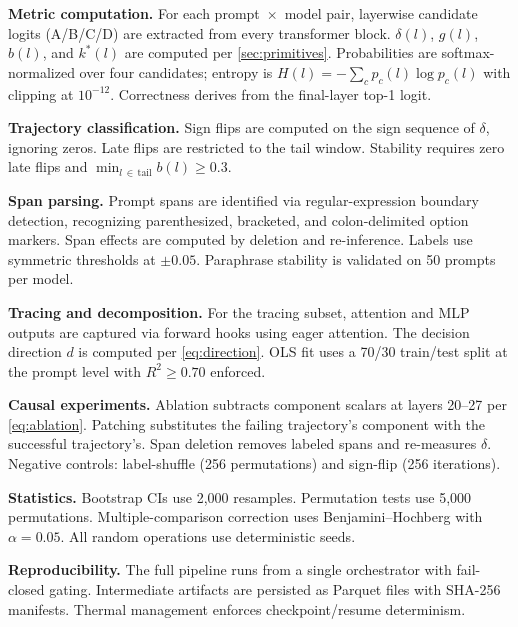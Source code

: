 \documentclass{article}
\begin{document}
\textbf{Metric computation.}  For each prompt~$\times$~model pair, layerwise candidate logits (A/B/C/D) are extracted from every transformer block.  $\delta(l)$, $g(l)$, $b(l)$, and $k^*(l)$ are computed per \cref{sec:primitives}.  Probabilities are softmax-normalized over four candidates; entropy is $H(l) = -\!\sum_c p_c(l)\log p_c(l)$ with clipping at $10^{-12}$.  Correctness derives from the final-layer top-1 logit.

\textbf{Trajectory classification.}  Sign flips are computed on the sign sequence of $\delta$, ignoring zeros.  Late flips are restricted to the tail window.  Stability requires zero late flips and $\min_{l\, \in\, \mathrm{tail}} b(l) \geq 0.3$.

\textbf{Span parsing.}  Prompt spans are identified via regular-expression boundary detection, recognizing parenthesized, bracketed, and colon-delimited option markers.  Span effects are computed by deletion and re-inference.  Labels use symmetric thresholds at $\pm 0.05$.  Paraphrase stability is validated on 50 prompts per model.

\textbf{Tracing and decomposition.}  For the tracing subset, attention and MLP outputs are captured via forward hooks using eager attention.  The decision direction $d$ is computed per \cref{eq:direction}.  OLS fit uses a 70/30 train/test split at the prompt level with $R^2 \geq 0.70$ enforced.

\textbf{Causal experiments.}  Ablation subtracts component scalars at layers 20--27 per \cref{eq:ablation}.  Patching substitutes the failing trajectory's component with the successful trajectory's.  Span deletion removes labeled spans and re-measures $\delta$.  Negative controls: label-shuffle (256 permutations) and sign-flip (256 iterations).

\textbf{Statistics.}  Bootstrap CIs use 2{,}000 resamples.  Permutation tests use 5{,}000 permutations.  Multiple-comparison correction uses Benjamini--Hochberg with $\alpha = 0.05$.  All random operations use deterministic seeds.

\textbf{Reproducibility.}  The full pipeline runs from a single orchestrator with fail-closed gating.  Intermediate artifacts are persisted as Parquet files with SHA-256 manifests.  Thermal management enforces checkpoint/resume determinism.
\end{document}
